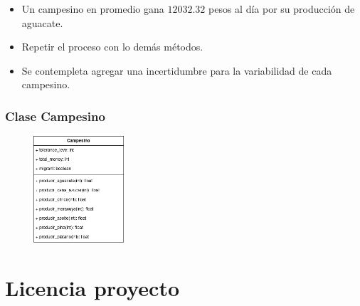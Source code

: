 \documentclass[17pt, t, lualatex]{beamer}
\begin{document}
\begin{frame}
  \begin{itemize}
    \item Un campesino en promedio gana $12032.32$ pesos al día por su producción de aguacate.
    \item Repetir el proceso con lo demás métodos.
    \item Se contempleta agregar una incertidumbre para la variabilidad de cada campesino.
  \end{itemize}
\end{frame}

\begin{frame}
  \frametitle{Clase Campesino}
  \begin{figure}[ht]
    \centering
    \includegraphics[width = 0.3\textwidth]{img/Migraciones.png}
  \end{figure}

\end{frame}


\section{Licencia proyecto}

\insertsectionpage
\end{document}
